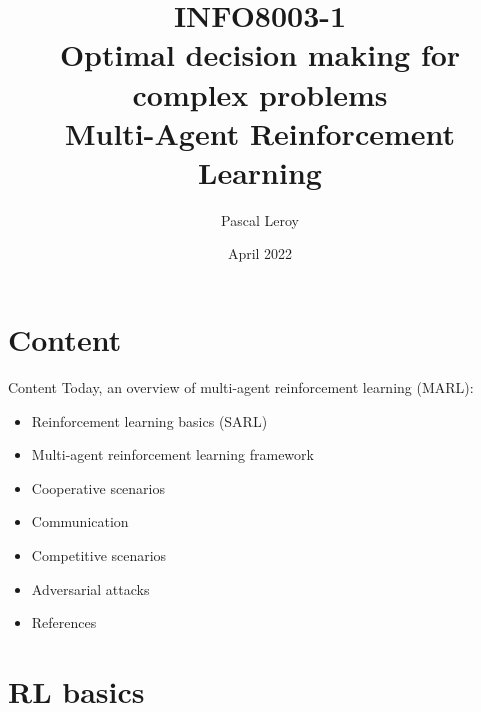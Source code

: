 \documentclass{beamer}
\author{Pascal Leroy}
\begin{document}
\title{
INFO8003-1 \\
Optimal decision making for complex problems
\\
\vspace{.7cm}
Multi-Agent Reinforcement Learning
}

\date{April 2022}
\maketitle


\section{Content}
\begin{frame}{Content}
Today, an overview of multi-agent reinforcement learning (MARL):
\vfill
\begin{itemize}
\item Reinforcement learning basics (SARL)
\vfill
\item Multi-agent reinforcement learning framework
\vfill
\item Cooperative scenarios
\vfill
\item Communication
\vfill
\item Competitive scenarios
\vfill
\item Adversarial attacks
\vfill
\item References
\end{itemize}

\end{frame}

\section{RL basics}
\begin{frame}[plain]{}
\end{frame}
\end{document}
